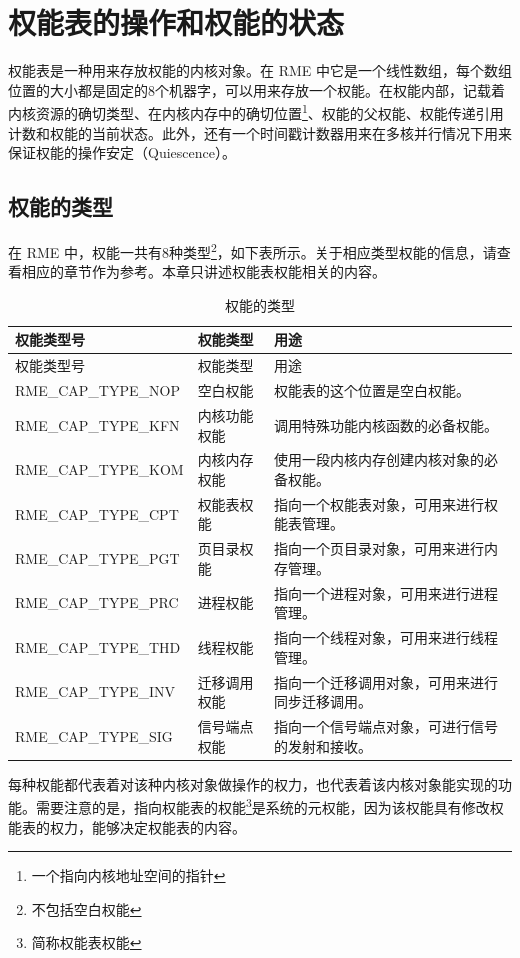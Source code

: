 \section{权能表的操作和权能的状态}\label{sec:2-capability-table-operations-and-states}

权能表是一种用来存放权能的内核对象。在 RME 中它是一个线性数组，每个数组位置的大小都是固定的8个机器字，可以用来存放一个权能。在权能内部，记载着内核资源的确切类型、在内核内存中的确切位置\footnote{一个指向内核地址空间的指针}、权能的父权能、权能传递引用计数和权能的当前状态。此外，还有一个时间戳计数器用来在多核并行情况下用来保证权能的操作安定（Quiescence）。

\subsection{权能的类型}\label{subsec:2-capability-types}

在 RME 中，权能一共有8种类型\footnote{不包括空白权能}，如下表所示。关于相应类型权能的信息，请查看相应的章节作为参考。本章只讲述权能表权能相关的内容。

\begin{xltabular}{\textwidth}{@{}>{\hsize\raggedright\arraybackslash}X>{\hsize\raggedright\arraybackslash}X>{\hsize\raggedright\arraybackslash}X@{}}
\caption{权能的类型}\label{tab:2-1-capability-types}\\
\toprule
权能类型号 & 权能类型 & 用途\tabularnewline
\endfirsthead
\toprule
权能类型号 & 权能类型 & 用途\tabularnewline
\midrule
\endhead
\bottomrule
\endlastfoot
RME\_CAP\_TYPE\_NOP & 空白权能 &
权能表的这个位置是空白权能。\tabularnewline
RME\_CAP\_TYPE\_KFN & 内核功能权能 &
调用特殊功能内核函数的必备权能。\tabularnewline
RME\_CAP\_TYPE\_KOM & 内核内存权能 &
使用一段内核内存创建内核对象的必备权能。\tabularnewline
RME\_CAP\_TYPE\_CPT & 权能表权能 &
指向一个权能表对象，可用来进行权能表管理。\tabularnewline
RME\_CAP\_TYPE\_PGT & 页目录权能 &
指向一个页目录对象，可用来进行内存管理。\tabularnewline
RME\_CAP\_TYPE\_PRC & 进程权能 &
指向一个进程对象，可用来进行进程管理。\tabularnewline
RME\_CAP\_TYPE\_THD & 线程权能 &
指向一个线程对象，可用来进行线程管理。\tabularnewline
RME\_CAP\_TYPE\_INV & 迁移调用权能 &
指向一个迁移调用对象，可用来进行同步迁移调用。\tabularnewline
RME\_CAP\_TYPE\_SIG & 信号端点权能 &
指向一个信号端点对象，可进行信号的发射和接收。\tabularnewline
\end{xltabular}

每种权能都代表着对该种内核对象做操作的权力，也代表着该内核对象能实现的功能。需要注意的是，指向权能表的权能\footnote{简称权能表权能}是系统的元权能，因为该权能具有修改权能表的权力，能够决定权能表的内容。

